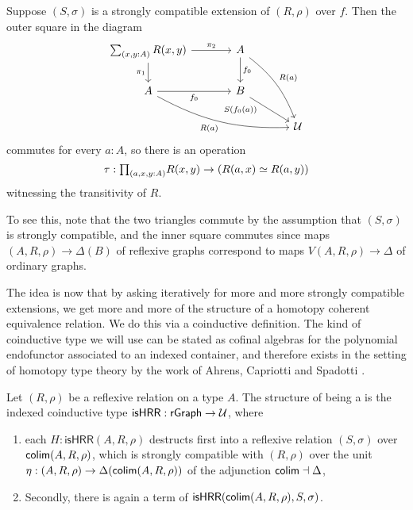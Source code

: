 \documentclass[reqno]{amsart}
\begin{document}
\begin{lem}
Suppose $(S,\sigma)$ is a strongly compatible extension of $(R,\rho)$ over $f$.
Then the outer square in the diagram
\begin{equation*}
\begin{tikzcd}[column sep=large]
\sm{x,y:A}R(x,y) \arrow[r,"\pi_2"] \arrow[d,swap,"\pi_1"] & A \arrow[d,"\pts{f}"] \arrow[ddr,bend left=15,"R(a)"] \\
A \arrow[r,swap,"\pts{f}"] \arrow[drr,bend right=15,swap,"R(a)"] & B \arrow[dr,swap,near start,"S(\pts{f}(a))"] \\
& & \UU
\end{tikzcd}
\end{equation*}
commutes for every $a:A$, so there is an operation
\begin{equation*}
\tau : \prd{a,x,y:A} R(x,y)\to (\eqv{R(a,x)}{R(a,y)})
\end{equation*}
witnessing the transitivity of $R$.
\end{lem}

To see this, note that the two triangles commute by the assumption that
$(S,\sigma)$ is strongly compatible, and the inner square commutes since
maps $(A,R,\rho)\to\Delta(B)$ of reflexive graphs correspond to maps 
$V(A,R,\rho)\to \Delta$ of ordinary graphs.

The idea is now that by asking iteratively for more and more strongly compatible
extensions, we get more and more of the structure of a homotopy coherent
equivalence relation. We do this via a coinductive definition. The kind of
coinductive type we will use can be stated as cofinal algebras for the
polynomial endofunctor associated to an indexed container, and therefore exists
in the setting of homotopy type theory by the work of Ahrens, Capriotti and
Spadotti \cite{AhrensCapriottiSpadotti}.

\begin{defn}
Let $(R,\rho)$ be a reflexive relation on a type $A$. 
The structure of being a  is the
indexed coinductive type $\mathsf{isHRR}:\mathsf{rGraph}\to\mathcal{U}$, where
\begin{enumerate}
\item each $H:\mathsf{isHRR}(A,R,\rho)$ destructs first into a reflexive relation
$(S,\sigma)$ over $\mathsf{colim}(A,R,\rho)$, which is strongly compatible with
$(R,\rho)$ over the unit $\eta : (A,R,\rho)\to\Delta(\mathsf{colim}(A,R,\rho))$
of the adjunction $\mathsf{colim}\dashv\Delta$,
\item Secondly, there is again a term of $\mathsf{isHRR}(\mathsf{colim}(A,R,\rho),S,\sigma)$. 
\end{enumerate}
\end{defn}
\end{document}
